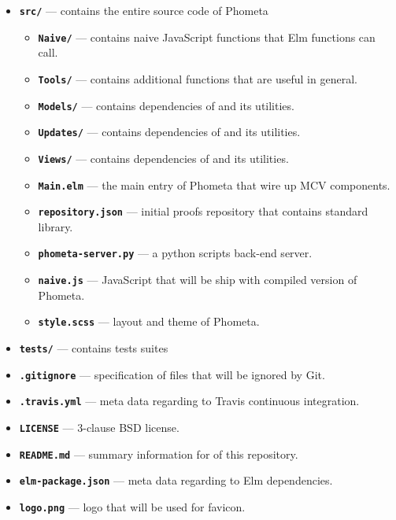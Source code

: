 \documentclass[master.tex]{subfiles}
\begin{document}
\begin{itemize}
\item \texttt{\textbf{src/}} --- contains the entire source code of Phometa
  \begin{itemize}
  \renewcommand{\labelitemii}{$\star$}
  \item \texttt{\textbf{Naive/}} --- contains naive JavaScript functions that
    Elm functions can call.
  \item \texttt{\textbf{Tools/}} --- contains additional functions that are
    useful in general.
  \item \texttt{\textbf{Models/}} --- contains dependencies of  and
    its utilities.
  \item \texttt{\textbf{Updates/}} --- contains dependencies of 
    and its utilities.
  \item \texttt{\textbf{Views/}} --- contains dependencies of 
    and its utilities.
  \item \texttt{\textbf{Main.elm}} --- the main entry of Phometa that
    wire up MCV components.
  \item \texttt{\textbf{repository.json}} --- initial proofs repository that
    contains standard library.
  \item \texttt{\textbf{phometa-server.py}} --- a python scripts back-end server.
  \item \texttt{\textbf{naive.js}} --- JavaScript that will be ship with
    compiled version of Phometa.
  \item \texttt{\textbf{style.scss}} --- layout and theme of Phometa.
  \end{itemize}
\item \texttt{\textbf{tests/}} --- contains tests suites
\item \texttt{\textbf{.gitignore}} --- specification of files that will be
  ignored by Git.
\item \texttt{\textbf{.travis.yml}} --- meta data regarding to Travis continuous
  integration.
\item \texttt{\textbf{LICENSE}} --- 3-clause BSD license.
\item \texttt{\textbf{README.md}} --- summary information for of this repository.
\item \texttt{\textbf{elm-package.json}} --- meta data regarding to Elm
  dependencies.
\item \texttt{\textbf{logo.png}} --- logo that will be used for favicon.

\end{itemize}
\end{document}
